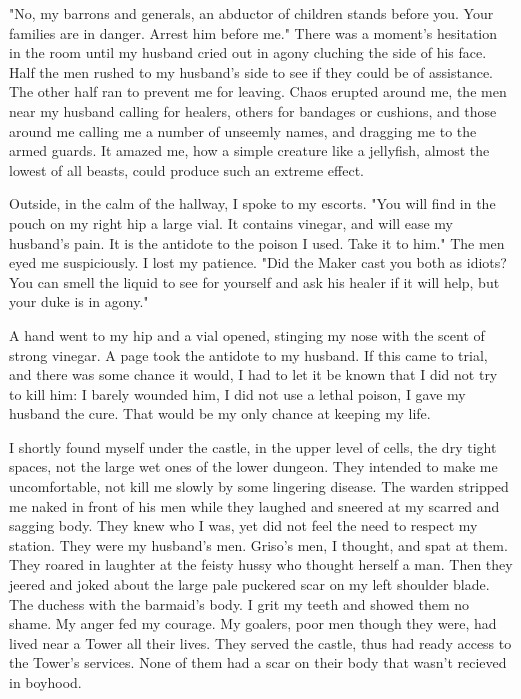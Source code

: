 \documentclass{article}
\begin{document}
"No, my barrons and generals, an abductor of children stands before you. Your families are in danger. Arrest him before me." There was a moment's hesitation in the room until my husband cried out in agony cluching the side of his face. Half the men rushed to my husband's side to see if they could be of assistance. The other half ran to prevent me for leaving. Chaos erupted around me, the men near my husband calling for healers, others for bandages or cushions, and those around me calling me a number of unseemly names, and dragging me to the armed guards. It amazed me, how a simple creature like a jellyfish, almost the lowest of all beasts, could produce such an extreme effect.

Outside, in the calm of the hallway, I spoke to my escorts. "You will find in the pouch on my right hip a large vial. It contains vinegar, and will ease my husband's pain. It is the antidote to the poison I used. Take it to him." The men eyed me suspiciously. I lost my patience. "Did the Maker cast you both as idiots? You can smell the liquid to see for yourself and ask his healer if it will help, but your duke is in agony."

A hand went to my hip and a vial opened, stinging my nose with the scent of strong vinegar. A page took the antidote to my husband. If this came to trial, and there was some chance it would, I had to let it be known that I did not try to kill him: I barely wounded him, I did not use a lethal poison, I gave my husband the cure. That would be my only chance at keeping my life. 

\vspace{.5cm}

I shortly found myself under the castle, in the upper level of cells, the dry tight spaces, not the large wet ones of the lower dungeon. They intended to make me uncomfortable, not kill me slowly by some lingering disease. The warden stripped me naked in front of his men while they laughed and sneered at my scarred and sagging body. They knew who I was, yet did not feel the need to respect my station. They were my husband's men. Griso's men, I thought, and spat at them. They roared in laughter at the feisty hussy who thought herself a man. Then they jeered and joked about the large pale puckered scar on my left shoulder blade. The duchess with the barmaid's body. I grit my teeth and showed them no shame. My anger fed my courage. My goalers, poor men though they were, had lived near a Tower all their lives. They served the castle, thus had ready access to the Tower's services. None of them had a scar on their body that wasn't recieved in boyhood.
\end{document}
